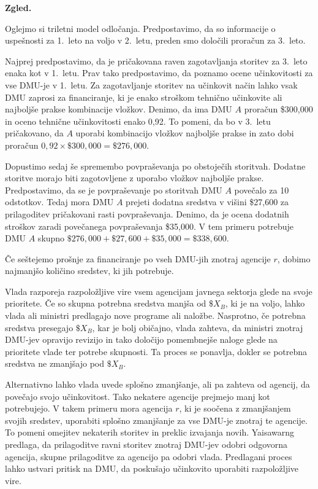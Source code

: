 \documentclass[12pt,a4paper]{article}
\theoremstyle{definition}
\newenvironment{zgled}{%
  \begin{mdframed}[linewidth=0.5pt, topline=true, bottomline=true, leftline=true, rightline=true, 
                  innertopmargin=\baselineskip, innerbottommargin=\baselineskip]%
  \textbf{Zgled.}%
}{%
  \end{mdframed}%
}
\begin{document}
\begin{zgled}
    Oglejmo si triletni model odločanja. Predpostavimo, 
    da so informacije o uspešnosti za 1.\ leto na voljo
    v 2.\ letu, preden smo določili proračun za 3.\ leto.

    Najprej predpostavimo, da je pričakovana raven
    zagotavljanja storitev za 3.\ leto enaka kot v 1.\
    letu. Prav tako predpostavimo, da poznamo ocene
    učinkovitosti za vse DMU-je v 1.\ letu. Za
    zagotavljanje storitev na učinkovit način lahko vsak
    DMU zaprosi za financiranje, ki je enako stroškom tehnično
    učinkovite ali najboljše prakse kombinacije vložkov.
    Denimo, da ima DMU $A$ proračun \$300{,}000 in oceno
    tehnične učinkovitosti enako 0{,}92. To pomeni, da bo v
    3.\ letu pričakovano, da $A$ uporabi kombinacijo vložkov
    najboljše prakse in zato dobi proračun $0{,}92 \times \$300{,}000 =
    \$276{,}000$.

    Dopustimo sedaj še spremembo povpraševanja po obstoječih
    storitvah. Dodatne storitve morajo biti zagotovljene
    z uporabo vložkov najboljše prakse. Predpostavimo,
    da se je povpraševanje po storitvah DMU $A$ povečalo
    za 10 odstotkov. Tedaj mora DMU $A$ prejeti dodatna
    sredstva v višini \$27{,}600 za prilagoditev 
    pričakovani rasti povpraševanja. Denimo, da je
    ocena dodatnih stroškov zaradi povečanega
    povpraševanja \$35{,}000. V tem primeru potrebuje
    DMU $A$ skupno $\$276{,}000 + \$27{,}600 + \$35{,}000
    = \$338{,}600$.
    
    Če seštejemo prošnje za financiranje po vseh DMU-jih
    znotraj agencije $r$, dobimo najmanjšo količino sredstev,
    ki jih potrebuje. \cite{Yaisawarng2002}
\end{zgled}

Vlada razporeja razpoložljive vire vsem agencijam 
javnega sektorja glede na svoje prioritete. Če so
skupna potrebna sredstva manjša od $\$X_B$, ki je na
voljo, lahko vlada ali ministri predlagajo nove 
programe ali naložbe. Nasprotno, če potrebna sredstva
presegajo $\$X_B$, kar je bolj običajno, vlada
zahteva, da ministri znotraj DMU-jev opravijo revizijo
in tako določijo pomembnejše naloge glede na prioritete
vlade ter potrebe skupnosti. Ta proces se ponavlja,
dokler se potrebna sredstva ne zmanjšajo pod $\$X_B$.

Alternativno lahko vlada uvede splošno zmanjšanje, ali
pa zahteva od agencij, da povečajo svojo učinkovitost.
Tako nekatere agencije prejmejo manj kot potrebujejo.
V takem primeru mora agencija $r$, ki je soočena z 
zmanjšanjem svojih sredstev, uporabiti splošno
zmanjšanje za vse DMU-je znotraj te agencije. To
pomeni omejitev nekaterih storitev in preklic
izvajanja novih. \mbox{Yaisawarng} predlaga, da
prilagoditve ravni storitev znotraj DMU-jev odobri
odgovorna agencija, skupne prilagoditve za agencijo
pa odobri vlada. Predlagani proces lahko ustvari 
pritisk na DMU, da poskušajo učinkovito uporabiti 
razpoložljive vire. 
\cite{Yaisawarng2002}
\end{document}
